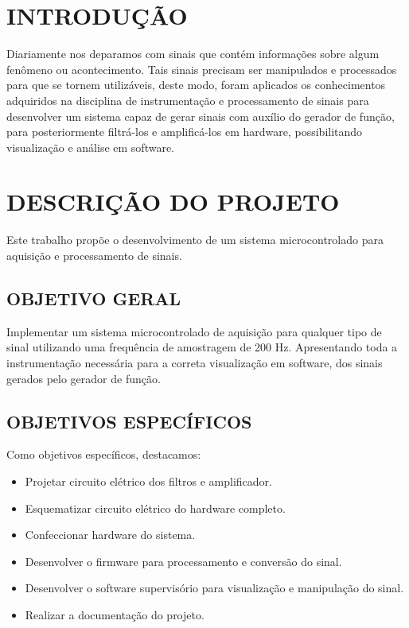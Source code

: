 \chapter{INTRODUÇÃO} 
Diariamente nos deparamos com sinais que contém informações sobre algum fenômeno ou acontecimento. Tais sinais precisam ser manipulados e processados para que se tornem utilizáveis, deste modo, foram aplicados os conhecimentos adquiridos na disciplina de instrumentação e processamento de sinais para desenvolver um sistema capaz de gerar sinais com auxílio do gerador de função, para posteriormente filtrá-los e amplificá-los em hardware, possibilitando visualização e análise em software.


\chapter{DESCRIÇÃO DO PROJETO}
Este trabalho propõe o desenvolvimento de um sistema microcontrolado para aquisição e processamento de sinais.

\section{OBJETIVO GERAL}
Implementar um sistema microcontrolado de aquisição para qualquer tipo de sinal utilizando uma frequência de amostragem de 200 Hz. Apresentando toda a instrumentação necessária para a correta visualização em software, dos sinais gerados pelo gerador de função.

\section{OBJETIVOS ESPECÍFICOS}
Como objetivos específicos, destacamos:
 \begin{itemize}
 	\item Projetar circuito elétrico dos filtros e amplificador.
  	\item Esquematizar circuito elétrico do hardware completo.
 	\item Confeccionar hardware do sistema.
 	\item Desenvolver o firmware para processamento e conversão do sinal.
 	\item Desenvolver o software supervisório para visualização e manipulação do sinal.
 	\item Realizar a documentação do projeto.
 \end{itemize}

